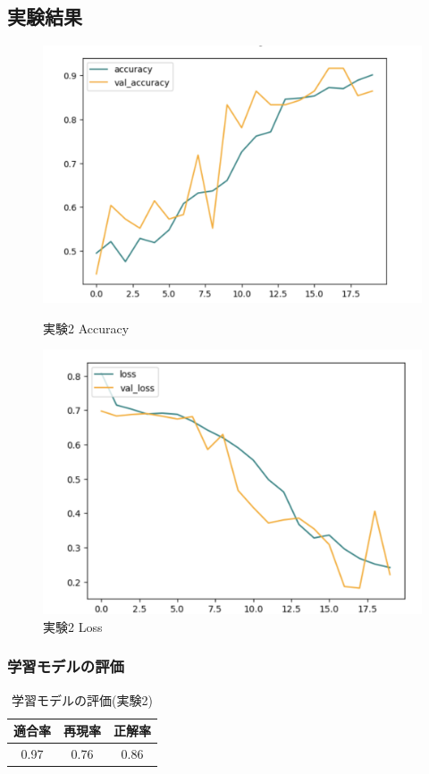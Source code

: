 \documentclass[a4paper, 11pt, titlepage]{jsarticle}
\begin{document}
\subsection{実験結果}
\begin{figure}[htbp]
  \begin{minipage}[b]{0.45\linewidth}
    \centering
    \includegraphics[keepaspectratio, scale=0.33]{ex2_acc.png}
    \caption{実験2 Accuracy}
  \end{minipage}
  \begin{minipage}[b]{0.45\linewidth}
    \centering
    \includegraphics[keepaspectratio, scale=0.33]{ex2_loss.png}
    \caption{実験2 Loss}
  \end{minipage}
\end{figure}

\subsubsection{学習モデルの評価}
\begin{table}[htb]
\centering
  \caption{学習モデルの評価(実験2)}
  \begin{tabular}{|c|c|c|}  \hline
    適合率 & 再現率 & 正解率 \\ \hline
    0.97 & 0.76 & 0.86 \\ \hline
  \end{tabular}
\end{table}
\end{document}
